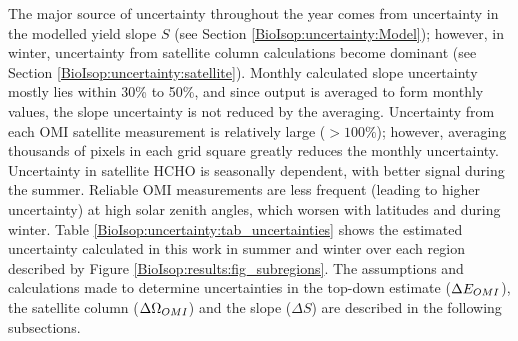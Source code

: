   The major source of uncertainty throughout the year comes from uncertainty in the modelled yield slope $S$ (see Section \ref{BioIsop:uncertainty:Model}); however, in winter, uncertainty from satellite column calculations become dominant (see Section \ref{BioIsop:uncertainty:satellite}).
  Monthly calculated slope uncertainty mostly lies within 30\% to 50\%, and since output is averaged to form monthly values, the slope uncertainty is not reduced by the averaging.
  Uncertainty from each OMI satellite measurement is relatively large ($>100\%$); however, averaging thousands of pixels in each grid square greatly reduces the monthly uncertainty.
  Uncertainty in satellite HCHO is seasonally dependent, with better signal during the summer.
  Reliable OMI measurements are less frequent (leading to higher uncertainty) at high solar zenith angles, which worsen with latitudes and during winter.
  Table \ref{BioIsop:uncertainty:tab_uncertainties} shows the estimated uncertainty calculated in this work in summer and winter over each region described by Figure \ref{BioIsop:results:fig_subregions}.
  The assumptions and calculations made to determine uncertainties in the top-down estimate ($\Delta E_{OMI}$), the satellite column ($\Delta \Omega_{OMI}$) and the slope ($\Delta S$) are described in the following subsections.
  
